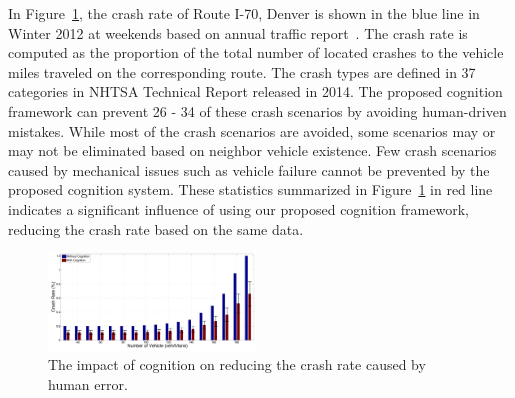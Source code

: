 \documentclass[journal, 11pt]{IEEEtran}
\begin{document}
{\color{red}In Figure~\ref{fig:errorPlot}, the crash rate of Route I-70, Denver
is shown in the blue line in Winter 2012 at weekends based on annual traffic
report~\cite{trb12}. The crash rate is computed as the proportion of  the total
number of located crashes to the vehicle miles traveled on the corresponding
route. The crash types are defined in 37 categories in NHTSA Technical Report
released in 2014. The proposed cognition framework can prevent 26 - 34 of  these
crash scenarios by avoiding human-driven mistakes. While most of the crash
scenarios are avoided, some scenarios may or may not be eliminated based on
neighbor vehicle existence. Few crash scenarios caused by mechanical issues such
as vehicle failure cannot be prevented by the proposed cognition system. These
statistics summarized in Figure~\ref{fig:errorPlot} in red line indicates a
significant influence of using our proposed cognition framework, reducing the
crash rate based on the same data.}

\begin{figure}[!t]
  \centering
  \includegraphics[width=0.49\textwidth]{figs/errorPlot.pdf}
  \caption{{\fontsize{10}{10}\selectfont The impact of cognition on reducing the
  crash rate caused by human error.}}
  \label{fig:errorPlot}
  \vspace*{-6mm}
\end{figure}
\end{document}
